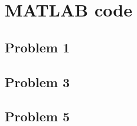 \appendix
\section{MATLAB code}
\subsection{Problem 1}

\subsection{Problem 3}

\subsection{Problem 5}
